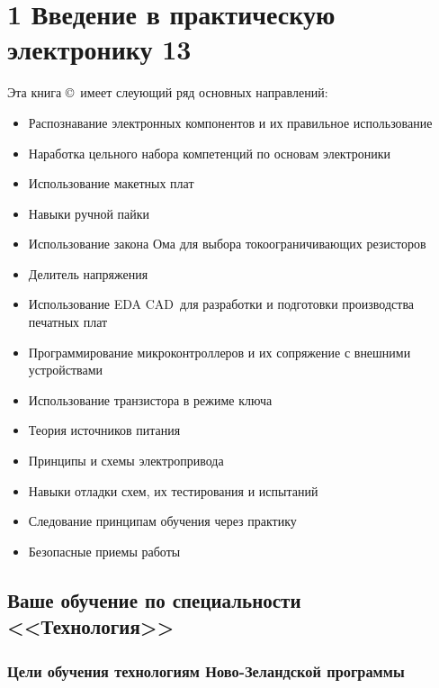 \chapter{1 Введение в практическую электронику 13}

Эта книга \copyright{}\ имеет слеующий ряд основных направлений:

\begin{itemize}
\item Распознавание электронных компонентов и их правильное использование
\item Наработка цельного набора компетенций по основам электроники
\item Использование макетных плат
\item Навыки ручной пайки
\item Использование закона Ома для выбора токоограничивающих резисторов
\item Делитель напряжения
\item Использование EDA CAD\ для разработки и подготовки
производства печатных плат
\item Программирование микроконтроллеров и их сопряжение с внешними устройствами
\item Использование транзистора в режиме ключа
\item Теория источников питания
\item Принципы и схемы электропривода
\item Навыки отладки схем, их тестирования и испытаний
\item Следование принципам обучения через практику
\item Безопасные приемы работы
\end{itemize}

\section{Ваше обучение по специальности <<Технология>>}

\subsection{Цели обучения технологиям Ново-Зеландской программы}

